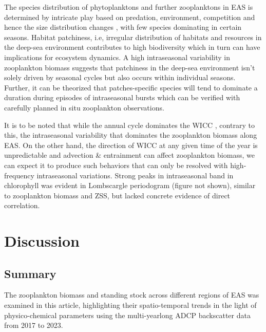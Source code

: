 \documentclass{article}
\begin{document}
    The species distribution of phytoplanktons and further zooplanktons in EAS is determined by intricate play based on predation, environment, competition \citep{raghukumar2003marine} and hence the size distribution changes \citep{madhupratap1996lack,kidwai2000dd,raghukumar2003marine, smith2005mesozooplankton,}, with few species dominating in certain seasons. Habitat patchiness, i.e, irregular distribution of habitats and resources in the deep-sea environment \citep{eggleston1998organism,raghukumar2003marine} contributes to high biodiversity which in turn can have implications for ecosystem dynamics. A high intraseasonal variability in zooplankton biomass suggests that patchiness in the deep-sea environment isn't solely driven by seasonal cycles but also occurs within individual seasons. Further, it can be theorized that patches-specific species will tend to dominate a duration during episodes of intraseasonal bursts which can be verified with carefully planned in situ zooplankton observations.
    
    It is to be noted that while the annual cycle dominates the WICC \citep{amol2014observed, chaudhuri2020observed,chaudhuri2021observed}, contrary to this, the intraseasonal variability that dominates the zooplankton biomass along EAS. On the other hand, the direction of WICC at any given time of the year is unpredictable \citep{chaudhuri2020observed} and advection \& entrainment can affect zooplankton biomass, we can expect it to produce such behaviors that can only be resolved with high-frequency intraseasonal variations. Strong peaks in intraseasonal band in chlorophyll was evident in Lombscargle periodogram (figure not shown), similar to zooplankton biomass and ZSS, but lacked concrete evidence of direct correlation. 
	
	\section{Discussion}

	\subsection{Summary}
	The zooplankton biomass and standing stock across different regions of EAS was examined in this article, highlighting their spatio-temporal trends in the light of physico-chemical parameters using the multi-yearlong ADCP backscatter data from 2017 to 2023. 
	
\end{document}
